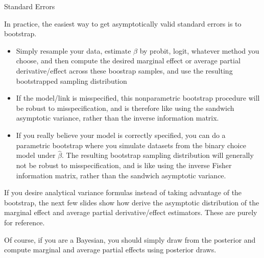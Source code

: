 \documentclass[aspectratio=169, handout]{beamer}
\begin{document}
{\scriptsize
\begin{frame}{Standard Errors}

In practice, the easiest way to get asymptotically valid standard errors
is to \alert{bootstrap}.
\begin{itemize}
  \item Simply resample your data, estimate $\beta$ by probit, logit,
    whatever method you choose, and then compute the desired marginal
    effect or average partial derivative/effect across these boostrap
    samples, and use the resulting bootstrapped sampling distribution

  \item If the model/link is \alert{misspecified}, this nonparametric
    bootstrap procedure will be robust to misspecification, and is
    therefore like using the sandwich asymptotic variance, rather than
    the inverse information matrix.

  \item If you really believe your model is \alert{correctly specified},
    you can do a \alert{parametric} bootstrap where you simulate
    datasets from the binary choice model under $\hat{\beta}$.
    The resulting bootstrap sampling distribution will generally not be
    robust to misspecification, and is like using the inverse Fisher
    information matrix, rather than the sandwich asymptotic variance.
\end{itemize}
If you desire analytical variance formulas instead of taking
advantage of the bootstrap, the next few slides show how derive the
asymptotic distribution of the marginal effect and average partial
derivative/effect estimators.
These are purely for reference.

Of course, if you are a Bayesian, you should simply draw from the
posterior and compute marginal and average partial effects using
posterior draws.
\end{frame}
}
\end{document}
